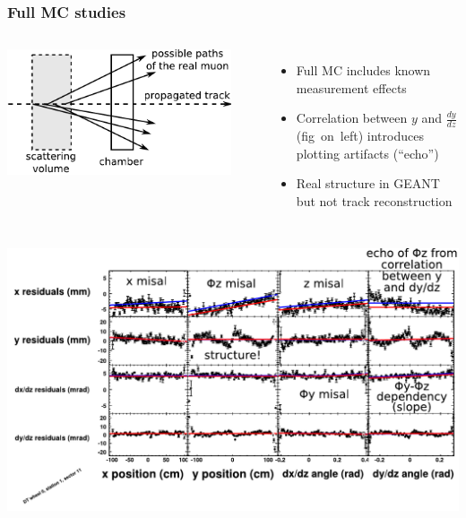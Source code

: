 \documentclass[compress]{beamer}
\begin{document}
\begin{frame}
\frametitle{Full MC studies}

\begin{columns}

\vspace{0.3 cm}
\includegraphics[width=1.15\linewidth]{sawtooth_diagram.pdf}

\vspace{-0.7 cm}
\mbox{ }

\begin{itemize}
\item Full MC includes known measurement effects
\item Correlation between $y$ and $\frac{dy}{dz}$ \mbox{(fig on left)\hspace{-0.5 cm}} introduces plotting artifacts (``echo'')
\item Real structure in GEANT but not track reconstruction
\end{itemize}
\end{columns}

\includegraphics[width=\linewidth]{mcfit_misal_and_nongeom.pdf}
\end{frame}
\end{document}
